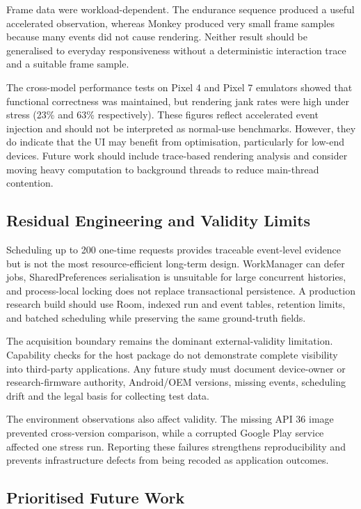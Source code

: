 Frame data were workload-dependent. The endurance sequence produced a useful accelerated observation, whereas Monkey produced very small frame samples because many events did not cause rendering. Neither result should be generalised to everyday responsiveness without a deterministic interaction trace and a suitable frame sample.

The cross-model performance tests on Pixel 4 and Pixel 7 emulators showed that functional correctness was maintained, but rendering jank rates were high under stress (23\% and 63\% respectively). These figures reflect accelerated event injection and should not be interpreted as normal-use benchmarks. However, they do indicate that the UI may benefit from optimisation, particularly for low-end devices. Future work should include trace-based rendering analysis and consider moving heavy computation to background threads to reduce main-thread contention.

\subsection{Residual Engineering and Validity Limits}

Scheduling up to 200 one-time requests provides traceable event-level evidence but is not the most resource-efficient long-term design. WorkManager can defer jobs, SharedPreferences serialisation is unsuitable for large concurrent histories, and process-local locking does not replace transactional persistence. A production research build should use Room, indexed run and event tables, retention limits, and batched scheduling while preserving the same ground-truth fields.

The acquisition boundary remains the dominant external-validity limitation. Capability checks for the host package do not demonstrate complete visibility into third-party applications. Any future study must document device-owner or research-firmware authority, Android/OEM versions, missing events, scheduling drift and the legal basis for collecting test data.

The environment observations also affect validity. The missing API 36 image prevented cross-version comparison, while a corrupted Google Play service affected one stress run. Reporting these failures strengthens reproducibility and prevents infrastructure defects from being recoded as application outcomes.

\subsection{Prioritised Future Work}

